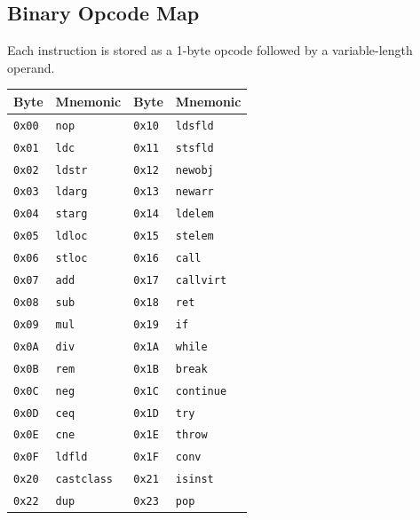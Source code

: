 \documentclass[11pt,a4paper]{article}
\begin{document}
\subsection{Binary Opcode Map}

Each instruction is stored as a 1-byte opcode followed by a variable-length
operand.

\begin{longtable}{llll}
  \toprule
  \textbf{Byte} & \textbf{Mnemonic} & \textbf{Byte} & \textbf{Mnemonic} \\
  \midrule
  \endhead
  \texttt{0x00} & \texttt{nop}       & \texttt{0x10} & \texttt{ldsfld}   \\
  \texttt{0x01} & \texttt{ldc}       & \texttt{0x11} & \texttt{stsfld}   \\
  \texttt{0x02} & \texttt{ldstr}     & \texttt{0x12} & \texttt{newobj}   \\
  \texttt{0x03} & \texttt{ldarg}     & \texttt{0x13} & \texttt{newarr}   \\
  \texttt{0x04} & \texttt{starg}     & \texttt{0x14} & \texttt{ldelem}   \\
  \texttt{0x05} & \texttt{ldloc}     & \texttt{0x15} & \texttt{stelem}   \\
  \texttt{0x06} & \texttt{stloc}     & \texttt{0x16} & \texttt{call}     \\
  \texttt{0x07} & \texttt{add}       & \texttt{0x17} & \texttt{callvirt} \\
  \texttt{0x08} & \texttt{sub}       & \texttt{0x18} & \texttt{ret}      \\
  \texttt{0x09} & \texttt{mul}       & \texttt{0x19} & \texttt{if}       \\
  \texttt{0x0A} & \texttt{div}       & \texttt{0x1A} & \texttt{while}    \\
  \texttt{0x0B} & \texttt{rem}       & \texttt{0x1B} & \texttt{break}    \\
  \texttt{0x0C} & \texttt{neg}       & \texttt{0x1C} & \texttt{continue} \\
  \texttt{0x0D} & \texttt{ceq}       & \texttt{0x1D} & \texttt{try}      \\
  \texttt{0x0E} & \texttt{cne}       & \texttt{0x1E} & \texttt{throw}    \\
  \texttt{0x0F} & \texttt{ldfld}     & \texttt{0x1F} & \texttt{conv}     \\
  \texttt{0x20} & \texttt{castclass} & \texttt{0x21} & \texttt{isinst}   \\
  \texttt{0x22} & \texttt{dup}       & \texttt{0x23} & \texttt{pop}      \\

\end{longtable}
\end{document}

